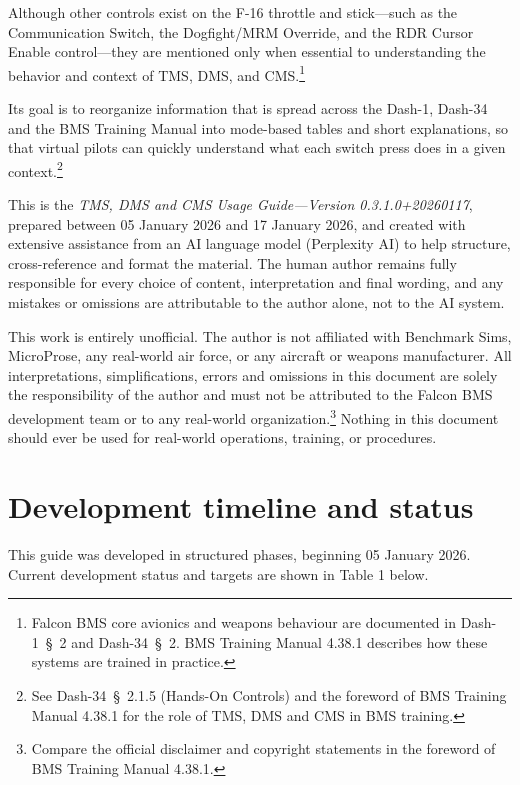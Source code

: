 \documentclass[11pt, a4paper, twoside]{report}
\providecommand{\dashref}[1]{Dash-34~\S~#1}
\providecommand{\dashone}[1]{Dash-1~\S~#1}
\providecommand{\trnman}{BMS Training Manual 4.38.1}
\newcommand{\docversion}{0.3.1.0}
\newcommand{\docbuild}{20260117}
\newcommand{\docstartdate}{05 January 2026}
\newcommand{\docenddate}{17 January 2026}
\newcommand{\fulldocversion}{\docversion+\docbuild}
\begin{document}
Although other controls exist on the F-16 throttle and stick---such as the Communication Switch, the Dogfight/MRM Override, and the RDR Cursor Enable control---they are mentioned only when essential to understanding the behavior and context of TMS, DMS, and CMS.\footnote{Falcon BMS core avionics and weapons behaviour are documented in \dashone{2} and \dashref{2}. \trnman{} describes how these systems are trained in practice.}

Its goal is to reorganize information that is spread across the Dash-1, Dash-34 and the BMS Training Manual into mode-based tables and short explanations, so that virtual pilots can quickly understand what each switch press does in a given context.\footnote{See \dashref{2.1.5} (Hands-On Controls) and the foreword of \trnman{} for the role of TMS, DMS and CMS in BMS training.}

This is the \emph{TMS, DMS and CMS Usage Guide---Version \fulldocversion}, prepared between \docstartdate{} and \docenddate{}, and created with extensive assistance from an AI language model (Perplexity AI) to help structure, cross-reference and format the material. The human author remains fully responsible for every choice of content, interpretation and final wording, and any mistakes or omissions are attributable to the author alone, not to the AI system.

This work is entirely unofficial. The author is not affiliated with Benchmark Sims, MicroProse, any real-world air force, or any aircraft or weapons manufacturer. All interpretations, simplifications, errors and omissions in this document are solely the responsibility of the author and must not be attributed to the Falcon BMS development team or to any real-world organization.\footnote{Compare the official disclaimer and copyright statements in the foreword of \trnman{}.} Nothing in this document should ever be used for real-world operations, training, or procedures.

\section{Development timeline and status}
\label{sec:C1-S1}

This guide was developed in structured phases, beginning \docstartdate{}. Current development status and targets are shown in Table 1 below.
\end{document}
